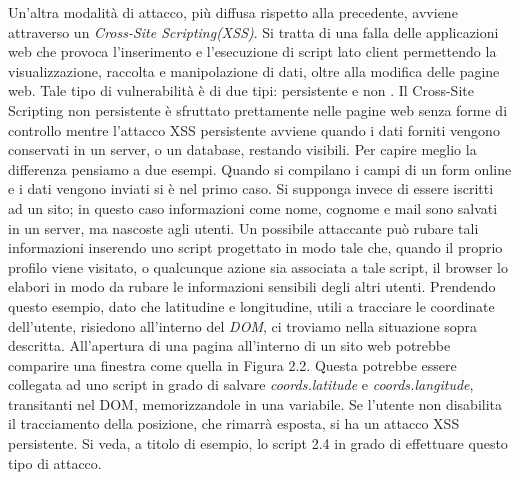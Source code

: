 \documentclass[12pt ,a4paper , twoside , openright ]{book}
\begin{document}
	Un'altra modalità di attacco, più diffusa rispetto alla precedente, avviene attraverso un \textit{Cross-Site Scripting(XSS)}. Si tratta di una falla delle applicazioni web che provoca l'inserimento e l'esecuzione di script lato client permettendo la visualizzazione, raccolta e  manipolazione di dati, oltre alla modifica delle pagine web. Tale tipo di vulnerabilità è di due tipi: persistente e non \cite{rif28}. Il Cross-Site Scripting non persistente è sfruttato prettamente nelle pagine web senza forme di controllo mentre l'attacco XSS persistente avviene quando i dati forniti vengono conservati in un server, o un database, restando visibili. Per capire meglio la differenza pensiamo a due esempi. Quando si compilano i campi di un form online e i dati vengono inviati si è nel primo caso. Si supponga invece di essere iscritti ad un sito; in questo caso informazioni come nome, cognome e mail sono salvati in un server, ma nascoste agli utenti. Un possibile attaccante può rubare tali informazioni inserendo uno script progettato in modo tale che, quando il proprio profilo viene visitato, o qualcunque azione sia associata a tale script, il browser lo elabori in modo da rubare le informazioni sensibili degli altri utenti. Prendendo questo esempio, dato che latitudine e longitudine, utili a tracciare le coordinate dell'utente, risiedono all'interno del \textit{DOM}, ci troviamo nella situazione sopra descritta. All'apertura di una pagina all'interno di un sito web potrebbe comparire una finestra come quella in Figura 2.2. Questa potrebbe essere collegata ad uno script \cite{rif7} in grado di salvare \textit{coords.latitude} e \textit{coords.langitude}, transitanti nel DOM, memorizzandole in una variabile. Se l'utente non disabilita il tracciamento della posizione, che rimarrà esposta, si ha un attacco XSS persistente. Si veda, a titolo di esempio, lo script 2.4 in grado di effettuare questo tipo di attacco.
	
	\pagebreak
\end{document}

